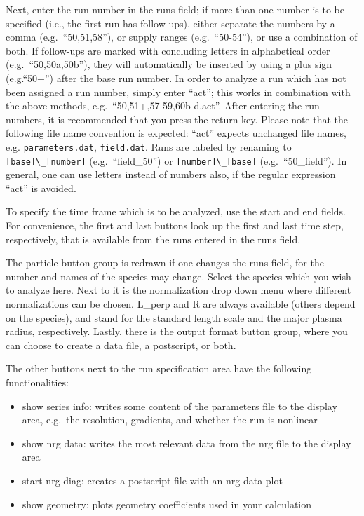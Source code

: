 \documentclass[12pt]{article}
\begin{document}
Next, enter the run number in the runs field; if more than one
number is to be specified (i.e., the first run has follow-ups),
either separate the numbers by a comma (e.g.~``50,51,58''), or
supply ranges (e.g.~``50-54''), or use a combination of both.
If follow-ups are marked with concluding letters in
alphabetical order (e.g.~``50,50a,50b''), they will automatically
be inserted by using a plus sign (e.g.``50+'') after the base
run number. In
order to analyze a run which has not been assigned a run number,
simply enter ``act''; this works in combination with the above
methods, e.g.~``50,51+,57-59,60b-d,act''. After entering the run
numbers, it is recommended that you press the return key. Please
note that the following file name convention is expected: ``act''
expects unchanged file names, e.g. \verb|parameters.dat|,
\verb|field.dat|. Runs are labeled by renaming to
\verb|[base]\_[number]| (e.g.~``field\_50'') or
\verb|[number]\_[base]| (e.g.~``50\_field''). In general, one can
use letters instead of numbers also, if the regular expression
``act'' is avoided.

To specify the time frame which is to be analyzed, use the start
and end fields. For convenience, the first and last buttons look
up the first and last time step, respectively, that is available
from the runs entered in the runs field.

The particle button group is redrawn if one changes the runs
field, for the number and names of the species may change. Select
the species which you wish to analyze here. Next to it is the
normalization drop down menu where different normalizations can be
chosen. L\_perp and R are always available (others depend on the
species), and stand for the standard \gene length scale and the
major plasma radius, respectively. Lastly, there is the output
format button group, where you can choose to create a data file, a
postscript, or both.

The other buttons next to the run specification area have the
following functionalities:
\begin{itemize}
\item show series info: writes some content of the parameters file
to the display area, e.g.~the resolution, gradients, and whether
the run is nonlinear
\item show nrg data: writes the most relevant data from the nrg
file to the display area
\item start nrg diag: creates a postscript file with an nrg data plot
\item show geometry: plots geometry coefficients used in your
\gene calculation
\end{itemize}
\end{document}
